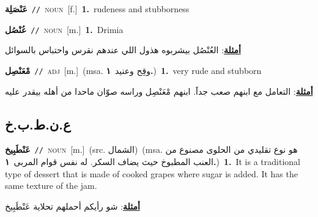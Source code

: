 \documentclass[10pt,a4paper,twoside]{article} %
\begin{document}
\begin{multicols}{2}
{\setlength\topsep{0pt}\textbf{\foreignlanguage{arabic}{عَنْصَلِة}}\ {\color{gray}\texttt{//}\color{black}}\ \textsc{noun}\ [f.]\ \textbf{1.}~rudeness and stubborness\ } \vspace{2mm}

{\setlength\topsep{0pt}\textbf{\foreignlanguage{arabic}{عُنْصُل}}\ {\color{gray}\texttt{//}\color{black}}\ \textsc{noun}\ [m.]\ \textbf{1.}~Drimia\  \begin{flushright}\color{gray}\foreignlanguage{arabic}{\textbf{\underline{\foreignlanguage{arabic}{أمثلة}}}: العُنْصُل بيشربوه هذول اللي عندهم نقرس واحتباس بالسوائل}\end{flushright}\color{black}} \vspace{2mm}

{\setlength\topsep{0pt}\textbf{\foreignlanguage{arabic}{مْعَنْصِل}}\ {\color{gray}\texttt{//}\color{black}}\ \textsc{adj}\ [m.]\ \color{gray}(msa. \foreignlanguage{arabic}{وقِح وعنيد}~\foreignlanguage{arabic}{\textbf{١.}})\color{black}\ \textbf{1.}~very rude and stubborn\  \begin{flushright}\color{gray}\foreignlanguage{arabic}{\textbf{\underline{\foreignlanguage{arabic}{أمثلة}}}: التعامل مع ابنهم صعب جداََ. ابنهم مْعَنْصِل وراسه صوّان ماحدا من أهله بيقدر عليه}\end{flushright}\color{black}} \vspace{2mm}

\vspace{-3mm}
\subsection*{\color{blue}\foreignlanguage{arabic}{ع.ن.ط.ب.خ}\color{blue}{ (ntws)}} 

{\setlength\topsep{0pt}\textbf{\foreignlanguage{arabic}{عَنْطَبِيخ}}\ {\color{gray}\texttt{//}\color{black}}\ \textsc{noun}\ [m.]\ (src. \color{gray}\foreignlanguage{arabic}{الشمال}\color{black})\ \color{gray}(msa. \foreignlanguage{arabic}{هو نوع تقليدي من الحلوى مصنوع من العنب المطبوخ حيث يضاف السكر. له نفس قوام المربى}~\foreignlanguage{arabic}{\textbf{١.}})\color{black}\ \textbf{1.}~It is a traditional type of dessert that is made of cooked grapes where sugar is added. It has the same texture of the jam.\  \begin{flushright}\color{gray}\foreignlanguage{arabic}{\textbf{\underline{\foreignlanguage{arabic}{أمثلة}}}: شو رأيكم أحملهم تحلاية عَنْطَبِيخ}\end{flushright}\color{black}} \vspace{2mm}


\end{multicols}
\end{document}
